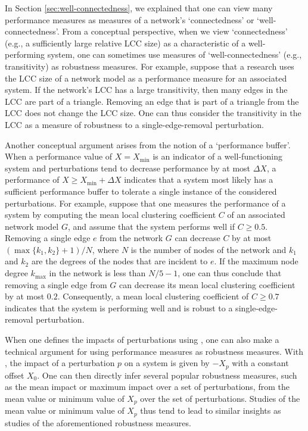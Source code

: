 \documentclass{comnet-mod}
\begin{document}
In Section \ref{sec:well-connectedness}, we explained that one can view many performance measures as measures of a network's `connectedness' or `well-connectedness'. From a conceptual perspective, when we view `connectedness' (e.g., a sufficiently large relative LCC size) as a characteristic of a well-performing system, one can sometimes use measures of `well-connectedness' (e.g., transitivity) as robustness measures.
For example, suppose that a research uses the LCC size of a network model as a performance measure for an associated system. If the network's LCC has a large transitivity, then many edges in the LCC are part of a triangle.
Removing an edge that is part of a triangle from the LCC does not change the LCC size. One can thus consider the transitivity in the LCC as a measure of robustness to a single-edge-removal perturbation.

Another conceptual argument arises from the notion of a `performance buffer'. When a performance value of $X = X_{\min}$ is an indicator of a well-functioning system and perturbations tend to decrease performance by at most $\Delta X$, a performance of $X \geq X_{\min} + \Delta X$ indicates that a system most likely has a sufficient performance buffer to tolerate a single instance of the considered perturbations. For example, suppose that one measures the performance of a system by computing the mean local clustering coefficient $C$ of an associated network model $G$, and assume that the system performs well if $C \geq 0.5$. Removing a single edge $e$ from the network $G$ can decrease $C$ by at most $(\max\{k_1,k_2\} + 1)/N$, where $N$ is the number of nodes of the network and $k_1$ and $k_2$ are the degrees of the nodes that are incident to $e$. If the maximum node degree $k_{\max}$ in the network is less than $N/5 - 1$, one can thus conclude that removing a single edge from $G$ can decrease its mean local clustering coefficient by at most $0.2$. Consequently, a mean local clustering coefficient of $C \geq 0.7$ indicates that the system is performing well and is robust to a single-edge-removal perturbation. 

When one defines the impacts of perturbations using , one can also make a technical argument for using performance measures as robustness measures. With , the impact of a perturbation $p$ on a system is given by $-X_p$ with a constant offset $X_0$. One can then directly infer several popular robustness measures, such as the mean impact or maximum impact over a set of perturbations, from the mean value or minimum value of $X_p$ over the set of perturbations. Studies of the mean value or minimum value of $X_p$ thus tend to lead to similar insights as studies of the aforementioned robustness measures.
\end{document}
